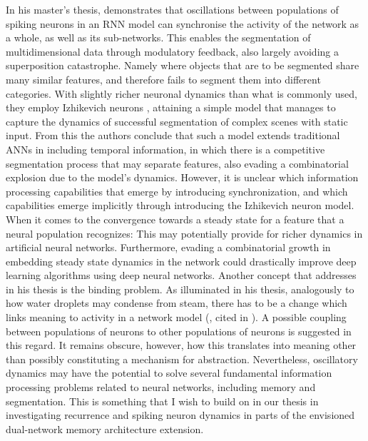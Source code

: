 In his master's thesis, \cite{Solbakken2009} demonstrates that oscillations between populations of spiking neurons in an RNN model can synchronise the activity of the network as a whole, as well as its sub-networks. This enables the segmentation of multidimensional data through modulatory feedback, also largely avoiding a superposition catastrophe. Namely where objects that are to be segmented share many similar features, and therefore fails to segment them into different categories. With slightly richer neuronal dynamics than what is commonly used, they employ Izhikevich neurons \citep{Izhikevich2003}, attaining a simple model that manages to capture the dynamics of successful segmentation of complex scenes with static input. From this the authors conclude that such a model extends traditional ANNs in including temporal information, in which there is a competitive segmentation process that may separate features, also evading a combinatorial explosion due to the model's dynamics. However, it is unclear which information processing capabilities that emerge by introducing synchronization, and which capabilities emerge implicitly through introducing the Izhikevich neuron model. When it comes to the convergence towards a steady state for a feature that a neural population recognizes: This may potentially provide for richer dynamics in artificial neural networks. Furthermore, evading a combinatorial growth in embedding steady state dynamics in the network could drastically improve deep learning algorithms using deep neural networks. Another concept that \cite{Solbakken2009} addresses in his thesis is the binding problem. As illuminated in his thesis, analogously to how water droplets may condense from steam,  there has to be a change which links meaning to activity in a network model (\cite{Freeman2003}, cited in \cite{Solbakken2009}). A possible coupling between populations of neurons to other populations of neurons is suggested in this regard. It remains obscure, however, how this translates into meaning other than possibly constituting a mechanism for abstraction. Nevertheless, oscillatory dynamics may have the potential to solve several fundamental information processing problems related to neural networks, including memory and segmentation. This is something that I wish to build on in our thesis in investigating recurrence and spiking neuron dynamics in parts of the envisioned dual-network memory architecture extension.

